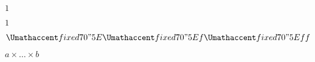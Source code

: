 \documentclass{article}
\def\hat{\Umathaccent fixed 7 0 "5E\relax}
\begin{document}
\show\times
$1$

{\Huge $1$}

$\hat{\hat{f}}\hat{f}f$


$a \times \dots \times b$
\end{document}
